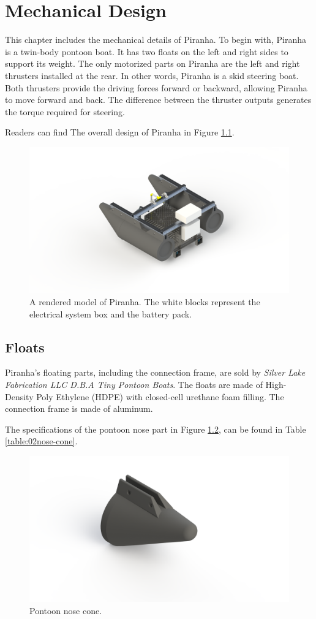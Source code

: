 \chapter{Mechanical Design}

This chapter includes the mechanical details of Piranha. To begin with, Piranha is a twin-body pontoon boat. It has two floats on the left and right sides to support its weight. The only motorized parts on Piranha are the left and right thrusters installed at the rear. In other words, Piranha is a skid steering boat. Both thrusters provide the driving forces forward or backward, allowing Piranha to move forward and back. The difference between the thruster outputs generates the torque required for steering.

Readers can find The overall design of Piranha in Figure \ref{fig:02rendered_all}.

\begin{figure}[H]
    \centering
    \includegraphics[width=.8\textwidth]{images/02orca-back.png}
    \caption{A rendered model of Piranha. The white blocks represent the electrical system box and the battery pack.}
    \label{fig:02rendered_all}
\end{figure}

\section{Floats}

Piranha's floating parts, including the connection frame, are sold by \textit{Silver Lake Fabrication LLC D.B.A Tiny Pontoon Boats}. The floats are made of High-Density Poly Ethylene (HDPE) with closed-cell urethane foam filling. The connection frame is made of aluminum.

The specifications of the pontoon nose part in Figure \ref{fig:02nose-cone}, can be found in Table \ref{table:02nose-cone}.

\begin{figure}[H]
    \centering
    \includegraphics[width=.6\textwidth]{images/02nose-cone.png}
    \caption{Pontoon nose cone.}
    \label{fig:02nose-cone}
\end{figure}

